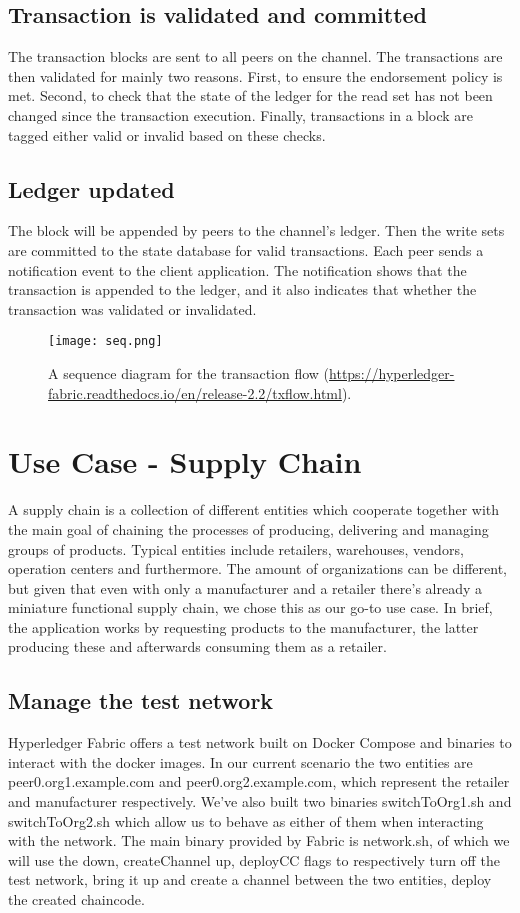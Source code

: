 \documentclass[sigconf,natbib=false]{acmart}
\begin{document}
    \subsection{Transaction is validated and committed}
    The transaction blocks are sent to all peers on the channel. The transactions are then validated for mainly two reasons. First, to ensure the endorsement policy is met. Second, to check that the state of the ledger for the read set has not been changed since the transaction execution. Finally, transactions in a block are tagged either valid or invalid based on these checks.
    \subsection{Ledger updated}
    The block will be appended by peers to the channel's ledger. Then the write sets are committed to the state database for valid transactions. Each peer sends a notification event to the client application. The notification shows that the transaction is appended to the ledger, and it also indicates that whether the transaction was validated or invalidated.
    \begin{figure}[h]
        \centering
        \texttt{[image: seq.png]}
        \caption{A sequence diagram for the transaction flow (\url{https://hyperledger-fabric.readthedocs.io/en/release-2.2/txflow.html}).}
    \end{figure}

    \section{Use Case - Supply Chain}
    A supply chain is a collection of different entities which cooperate together with the main goal of chaining the processes of producing, delivering and managing groups of products.\cite{techtarget} Typical entities include retailers, warehouses, vendors, operation centers and furthermore. The amount of organizations can be different, but given that even with only a manufacturer and a retailer there's already a miniature functional supply chain, we chose this as our go-to use case. In brief, the application works by requesting products to the manufacturer, the latter producing these and afterwards consuming them as a retailer.
    \subsection{Manage the test network}
    Hyperledger Fabric offers a test network built on Docker Compose and binaries to interact with the docker images.\cite{hyperledger} In our current scenario the two entities are peer0.org1.example.com and peer0.org2.example.com, which represent the retailer and manufacturer respectively. We've also built two binaries switchToOrg1.sh and switchToOrg2.sh which allow us to behave as either of them when interacting with the network. The main binary provided by Fabric is network.sh, of which we will use the down, createChannel up, deployCC flags to respectively turn off the test network, bring it up and create a channel between the two entities, deploy the created chaincode.
\end{document}
